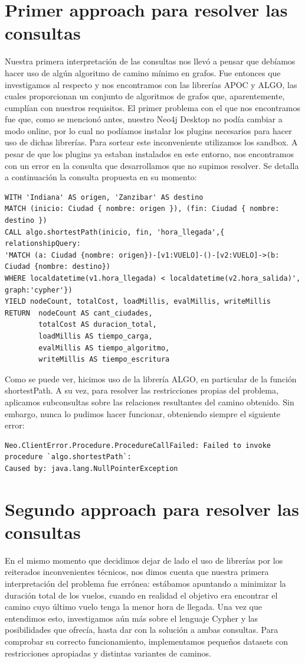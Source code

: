 \documentclass[a4paper,11pt]{article}
\begin{document}
\section{Primer approach para resolver las consultas}
Nuestra primera interpretación de las consultas nos llevó a pensar que debíamos hacer uso de algún algoritmo de camino mínimo en grafos. Fue entonces que investigamos al respecto y nos encontramos con las librerías APOC y ALGO, las cuales proporcionan un conjunto de algoritmos de grafos que, aparentemente, cumplían con nuestros requisitos.
El primer problema con el que nos encontramos fue que, como se mencionó antes, nuestro Neo4j Desktop no podía cambiar a modo online, por lo cual no podíamos instalar los plugins necesarios para hacer uso de dichas librerías.
Para sortear este inconveniente utilizamos los sandbox. A pesar de que los plugins ya estaban instalados en este entorno, nos encontramos con un error en la consulta que desarrollamos que no supimos resolver.
Se detalla a continuación la consulta propuesta en su momento:
\newpage
\begin{lstlisting}[style=neo4j]
WITH 'Indiana' AS origen, 'Zanzibar' AS destino
MATCH (inicio: Ciudad { nombre: origen }), (fin: Ciudad { nombre: destino })
CALL algo.shortestPath(inicio, fin, 'hora_llegada',{ relationshipQuery:
'MATCH (a: Ciudad {nombre: origen})-[v1:VUELO]-()-[v2:VUELO]->(b: Ciudad {nombre: destino})
WHERE localdatetime(v1.hora_llegada) < localdatetime(v2.hora_salida)', graph:'cypher'})
YIELD nodeCount, totalCost, loadMillis, evalMillis, writeMillis
RETURN 	nodeCount AS cant_ciudades,
		totalCost AS duracion_total,
		loadMillis AS tiempo_carga,
		evalMillis AS tiempo_algoritmo,
		writeMillis AS tiempo_escritura
\end{lstlisting}
Como se puede ver, hicimos uso de la librería ALGO, en particular de la función shortestPath. A su vez, para resolver las restricciones propias del problema, aplicamos subconsultas sobre las relaciones resultantes del camino obtenido.
Sin embargo, nunca lo pudimos hacer funcionar, obteniendo siempre el siguiente error:
\begin{lstlisting}[style=neo4j]
Neo.ClientError.Procedure.ProcedureCallFailed: Failed to invoke 
procedure `algo.shortestPath`:
Caused by: java.lang.NullPointerException
\end{lstlisting}

\section{Segundo approach para resolver las consultas}
En el mismo momento que decidimos dejar de lado el uso de librerías por los reiterados inconvenientes técnicos, nos dimos cuenta que nuestra primera interpretación del problema fue errónea: estábamos apuntando a minimizar la duración total de los vuelos, cuando en realidad el objetivo era encontrar el camino cuyo último vuelo tenga la menor hora de llegada.
Una vez que entendimos esto, investigamos aún más sobre el lenguaje Cypher y las posibilidades que ofrecía, hasta dar con la solución a ambas consultas.
Para comprobar su correcto funcionamiento, implementamos pequeños datasets con restricciones apropiadas y distintas variantes de caminos.
\end{document}
